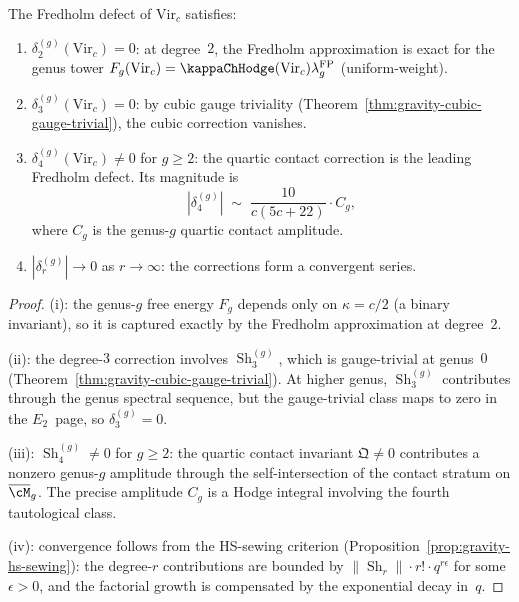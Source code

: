 \begin{proposition}
\label{prop:gravity-fredholm-defect}
The Fredholm defect of $\mathrm{Vir}_c$ satisfies:
\begin{enumerate}[label=\textup{(\roman*)}]
\item $\delta_2^{(g)}(\mathrm{Vir}_c) = 0$: at degree~$2$, the
 Fredholm approximation is exact for the genus tower
 $F_g(\mathrm{Vir}_c)=\kappaChHodge(\mathrm{Vir}_c)
 \lambda_g^{\mathrm{FP}}$
 \textup{(}uniform-weight\textup{)}.
\item $\delta_3^{(g)}(\mathrm{Vir}_c) = 0$: by cubic gauge
 triviality \textup{(}Theorem~\textup{\ref{thm:gravity-cubic-gauge-trivial}}\textup{)},
 the cubic correction vanishes.
\item $\delta_4^{(g)}(\mathrm{Vir}_c) \ne 0$ for $g \ge 2$:
 the quartic contact correction is the leading Fredholm defect.
 Its magnitude is
 \[
 |\delta_4^{(g)}| \;\sim\;
 \frac{10}{c(5c+22)} \cdot C_g,
 \]
 where $C_g$ is the genus-$g$ quartic contact amplitude.
\item $|\delta_r^{(g)}| \to 0$ as $r \to \infty$: the
 corrections form a convergent series.
\end{enumerate}
\end{proposition}

\begin{proof}
(i): the genus-$g$ free energy $F_g$ depends only on
$\kappa = c/2$ (a binary invariant), so it is captured
exactly by the Fredholm approximation at degree~$2$.

(ii): the degree-$3$ correction involves
$\operatorname{Sh}_3^{(g)}$, which is gauge-trivial at
genus~$0$ (Theorem~\ref{thm:gravity-cubic-gauge-trivial}).
At higher genus, $\operatorname{Sh}_3^{(g)}$ contributes
through the genus spectral sequence, but the gauge-trivial
class maps to zero in the $E_2$~page, so
$\delta_3^{(g)} = 0$.

(iii): $\operatorname{Sh}_4^{(g)} \ne 0$ for $g \ge 2$:
the quartic contact invariant $\mathfrak{Q} \ne 0$ contributes
a nonzero genus-$g$ amplitude through the self-intersection
of the contact stratum on $\overline{\cM}_g$. The precise
amplitude $C_g$ is a Hodge integral involving the fourth
tautological class.

(iv): convergence follows from the HS-sewing criterion
(Proposition~\ref{prop:gravity-hs-sewing}): the degree-$r$
contributions are bounded by
$\|\operatorname{Sh}_r\| \cdot r! \cdot q^{r\epsilon}$ for some
$\epsilon > 0$, and the factorial growth is compensated by the
exponential decay in~$q$.
\end{proof}

